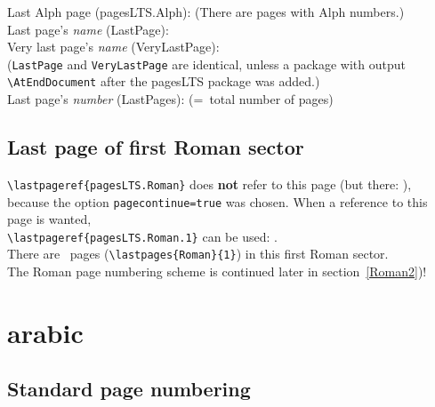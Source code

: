 \documentclass[british]{article}
\begin{document}
\noindent Last Alph page (pagesLTS.Alph): 
(There are  pages with Alph numbers.)\\

\noindent Last page's \textit{name} (LastPage): \\

\noindent Very last page's \textit{name} (VeryLastPage): \\
(\texttt{LastPage} and \texttt{VeryLastPage} are identical, unless
a package with output \linebreak
\texttt{\textbackslash AtEndDocument} after the \textsf{pagesLTS} package
was added.)\\

\noindent Last page's \textit{number} (LastPages): 
(=~total number of pages)\\

\lipsum[1-4]

\newpage

\subsection{Last page of first Roman sector}
\texttt{\textbackslash lastpageref\{pagesLTS.Roman\}} does \textbf{not}
refer to this page (but there: ),
because the option \texttt{pagecontinue=true}
was chosen. When a reference to this page is wanted,\\
\texttt{\textbackslash lastpageref\{pagesLTS.Roman.1\}}
can be used: .\\

\bigskip
There are ~pages
(\texttt{\textbackslash lastpages\{Roman\}\{1\}})
in this first Roman sector.\\
The Roman page numbering scheme is continued later in
section~\ref{Roman2})!

\newpage


\section{arabic}

\subsection{Standard page numbering}
\end{document}
